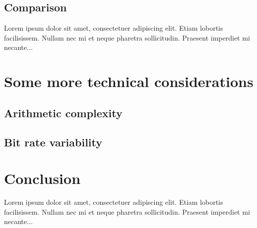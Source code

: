 \documentclass{article}
\begin{document}
 \subsection{Comparison}
Lorem ipsum dolor sit amet, consectetuer adipiscing elit.  
Etiam lobortis facilisissem.  Nullam nec mi et neque pharetra 
sollicitudin.  Praesent imperdiet mi necante...

\section{Some more technical considerations}
\subsection{Arithmetic complexity}
\subsection{Bit rate variability} 

 \section{Conclusion}
 
Lorem ipsum dolor sit amet, consectetuer adipiscing elit.  
Etiam lobortis facilisissem.  Nullam nec mi et neque pharetra 
sollicitudin.  Praesent imperdiet mi necante...
 
\end{document}
